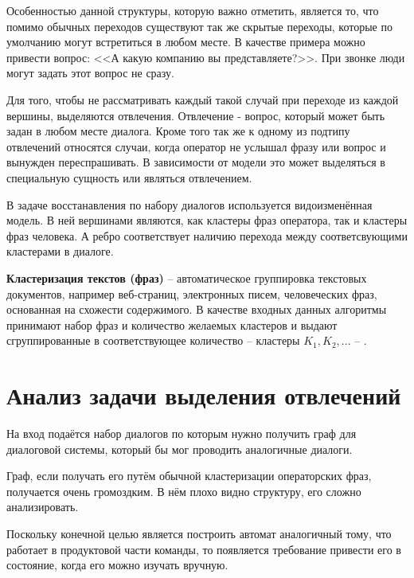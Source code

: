 \documentclass[specification,annotation]{itmo-student-thesis}
\begin{document}
	Особенностью данной структуры, которую важно отметить, является то, что помимо обычных переходов существуют так же скрытые переходы, которые по умолчанию могут встретиться в любом месте. В качестве примера можно привести вопрос: <<А какую компанию вы представляете?>>. При звонке люди могут задать этот вопрос не сразу.
	
	Для того, чтобы не рассматривать каждый такой случай при переходе из каждой вершины, выделяются $\textbf{отвлечения}$. 
	$\textbf{Отвлечение}$ - вопрос, который может быть задан в любом месте диалога. Кроме того так же к одному из подтипу отвлечений относятся случаи, когда оператор не услышал фразу или вопрос и вынужден переспрашивать. В зависимости от модели это может выделяться в специальную сущность или являться отвлечением.
	
	В задаче восстанавления по набору диалогов используется видоизменённая модель. В ней вершинами являются, как кластеры фраз оператора, так и кластеры фраз человека. А ребро соответствует наличию перехода между соответсвующими кластерами в диалоге.
	
	\textbf{Кластеризация текстов (фраз)} -- автоматическое группировка текстовых документов, например веб-страниц, электронных писем, человеческих фраз, основанная на схожести содержимого. В качестве входных данных алгоритмы принимают набор фраз и количество желаемых кластеров и выдают сгруппированные в соответствующее количество -- кластеры $K_1, K_2, ...$ -- \cite{Li2009}.
	
	\section{Анализ задачи выделения отвлечений}%
	На вход подаётся набор диалогов по которым нужно получить граф для диалоговой системы, который бы мог проводить аналогичные диалоги.
	
	Граф, если получать его путём обычной кластеризации операторских фраз, получается очень громоздким. В нём плохо видно структуру, его сложно анализировать.
	
	Поскольку конечной целью является построить автомат аналогичный тому, что работает в продуктовой части команды, то появляется требование привести его в состояние, когда его можно изучать вручную. 
	
\end{document}
